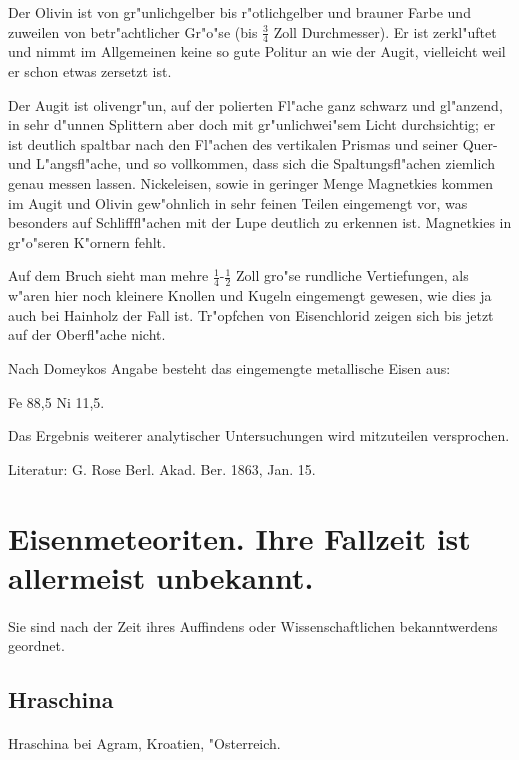 \documentclass[a4paper, 11pt, oneside]{article}
\begin{document}
Der Olivin ist von gr"unlichgelber bis r"otlichgelber und brauner Farbe und zuweilen von betr"achtlicher Gr"o"se (bis $\frac{3}{4}$ Zoll Durchmesser). Er ist zerkl"uftet und nimmt im Allgemeinen keine so gute Politur an wie der Augit, vielleicht weil er schon etwas zersetzt ist.

Der Augit ist olivengr"un, auf der polierten Fl"ache ganz schwarz und gl"anzend, in sehr d"unnen Splittern aber doch mit gr"unlichwei"sem Licht durchsichtig; er ist deutlich spaltbar nach den Fl"achen des vertikalen Prismas und seiner Quer- und L"angsfl"ache, und so vollkommen, dass sich die Spaltungsfl"achen ziemlich genau messen lassen. Nickeleisen, sowie in geringer Menge Magnetkies kommen im Augit und Olivin gew"ohnlich in sehr feinen Teilen eingemengt vor, was besonders auf Schlifffl"achen mit der Lupe deutlich zu erkennen ist. Magnetkies in gr"o"seren K"ornern fehlt.

Auf dem Bruch sieht man mehre $\frac{1}{4}$-$\frac{1}{2}$ Zoll gro"se rundliche Vertiefungen, als w"aren hier noch kleinere Knollen und Kugeln eingemengt gewesen, wie dies ja auch bei Hainholz der Fall ist. Tr"opfchen von Eisenchlorid zeigen sich bis jetzt auf der Oberfl"ache nicht.

Nach Domeykos Angabe besteht das eingemengte metallische Eisen aus:

Fe 88,5  
Ni 11,5.

Das Ergebnis weiterer analytischer Untersuchungen wird mitzuteilen versprochen.

\footnotesize
Literatur: G. Rose Berl. Akad. Ber. 1863, Jan. 15.

\section{Eisenmeteoriten. Ihre Fallzeit ist allermeist unbekannt.}
\normalsize
\paragraph{}
Sie sind nach der Zeit ihres Auffindens oder Wissenschaftlichen bekanntwerdens geordnet.
\subsection{Hraschina}
\paragraph{}
Hraschina bei Agram, Kroatien, "Osterreich.
\end{document}

